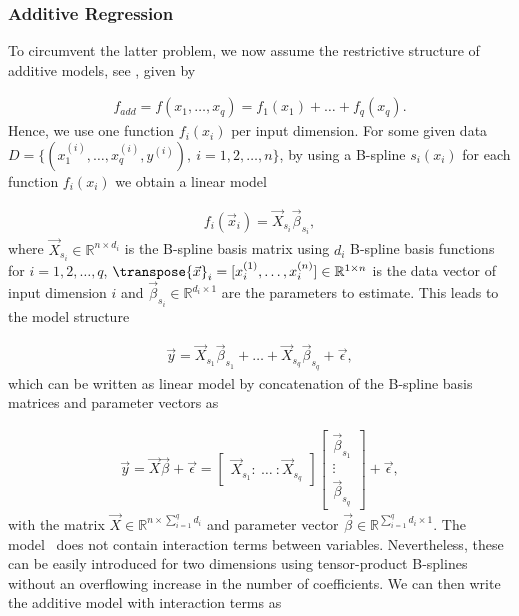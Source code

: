 \subsubsection{Additive Regression} \label{subsubsec:STAR}

To circumvent the latter problem, we now assume the restrictive structure of additive models, see \cite{fahrmeir2007regression}, given by

\begin{align} \label{eq:addRegBaseEquation}
	f_{add} = f(x_1, \dots, x_q) = f_1(x_1) + \dots + f_q(x_q).
\end{align}
%
Hence, we use one function $f_i(x_i)$ per input dimension. For some given data $D = \{ (x^{(i)}_{1}, \dots, x^{(i)}_{q}, y^{(i)} ), \ i=1,2, \dots, n\}$, by using a B-spline $s_i(x_i)$ for each function $f_i(x_i)$ we obtain a linear model

\begin{align} \label{eq:addRegBaseEquation-as-linModel}
	f_i(\vec{x}_i) = \vec{X}_{s_i} \vec{\beta}_{s_i},
\end{align}
%
where $\vec{X}_{s_i} \in \mathbb R^{n \times d_i}$ is the B-spline basis matrix using $d_i$ B-spline basis functions for $i=1,2,\dots, q$, $\transpose{\vec{x}}_i = [x_i^{(1)}, \dots, x_i^{(n)}] \in \mathbb{R}^{1 \times n}$ is the data vector of input dimension $i$ and $\vec{\beta}_{s_i} \in \mathbb R^{d_i \times 1}$ are the parameters to estimate. This leads to the model structure 

\begin{align} 
	\vec{y} =  \vec{X}_{s_1} \vec{\beta}_{s_1} + \dots + \vec{X}_{s_q} \vec{\beta}_{s_q} + \vec{\epsilon},
\end{align}
%
which can be written as linear model by concatenation of the B-spline basis matrices and parameter vectors as 

\begin{align} \label{eq:STAR-single-block-diag}
	\vec{y} = \vec{X} \vec{\beta} + \vec{\epsilon}= 
				\begin{bmatrix}
					\vec{X}_{s_1} \colon \ \dots \ \colon \vec{X}_{s_q} 
				\end{bmatrix}
			    \begin{bmatrix}
					\vec{\beta}_{s_1} \\ 
					\vdots \\
					\vec{\beta}_{s_q} 
				\end{bmatrix} + \vec{\epsilon},
\end{align}
%
with the matrix $\vec{X} \in \mathbb{R}^{n \times \sum_{i=1}^q d_i}$ and parameter vector $\vec{\beta} \in \mathbb{R}^{\sum_{i=1}^q d_i \times 1}$. The model~ does not contain interaction terms between variables. Nevertheless, these can be easily introduced for two dimensions using tensor-product B-splines without an overflowing increase in the number of coefficients. We can then write the additive model with interaction terms as 

